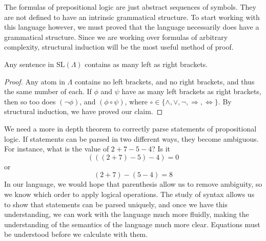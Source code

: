 The formulas of prepositional logic are just abstract sequences of symbols. They are not defined to have an intrinsic grammatical structure. To start working with this language however, we must proved that the language necessarily does have a grammatical structure. Since we are working over formulas of arbitrary complexity, structural induction will be the most useful method of proof.

\begin{theorem}
    Any sentence in $\text{SL}(\Lambda)$ contains as many left as right brackets.
\end{theorem}
\begin{proof}
    Any atom in $\Lambda$ contains no left brackets, and no right brackets, and thus the same number of each. If $\phi$ and $\psi$ have as many left brackets as right brackets, then so too does $(\neg \phi)$, and $(\phi \circ \psi)$, where $\circ \in \{ \wedge, \vee, \neg, \Rightarrow, \Leftrightarrow \}$. By structural induction, we have proved our claim.
\end{proof}

We need a more in depth theorem to correctly parse statements of propositional logic. If statements can be parsed in two different ways, they become ambiguous. For instance, what is the value of $2 + 7 - 5 - 4$? Is it
%
\[ (((2 + 7) - 5) - 4) = 0 \]
%
or
%
\[ (2 + 7) - (5 - 4) = 8 \]
%
In our language, we would hope that parenthesis allow us to remove ambiguity, so we know which order to apply logical operations. The study of syntax allows us to show that statements can be parsed uniquely, and once we have this understanding, we can work with the language much more fluidly, making the understanding of the semantics of the language much more clear. Equations must be understood before we calculate with them.

